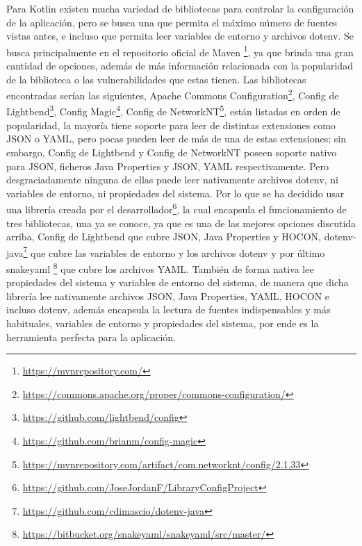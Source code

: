 Para Kotlin existen mucha variedad de bibliotecas para controlar la configuración de la aplicación, pero se busca 
una que permita el máximo número de fuentes vistas antes, e incluso que permita leer variables de entorno y archivos 
dotenv. Se busca principalmente en el repositorio oficial de Maven \footnote{\url{https://mvnrepository.com/}}, ya 
que brinda una gran cantidad de opciones, además de más información relacionada con la popularidad de la biblioteca 
o las vulnerabilidades que estas tienen. Las bibliotecas encontradas serían las siguientes, Apache Commons 
Configuration\footnote{\url{https://commons.apache.org/proper/commons-configuration/}}, Config de 
Lightbend\footnote{\url{https://github.com/lightbend/config}}, Config 
Magic\footnote{\url{https://github.com/brianm/config-magic}}, Config de 
NetworkNT\footnote{\url{https://mvnrepository.com/artifact/com.networknt/config/2.1.33}}, están listadas en orden de
popularidad, la mayoría tiene soporte para leer de distintas extensiones como JSON o YAML, pero pocas pueden leer de
más de una de estas extensiones; sin embargo, Config de Lightbend y  Config de NetworkNT poseen soporte nativo para 
JSON, ficheros Java Properties y JSON, YAML respectivamente. Pero desgraciadamente ninguna de ellas puede leer 
nativamente archivos dotenv, ni variables de entorno, ni propiedades del sistema. Por lo que se ha decidido usar una 
librería creada por el desarrollador\footnote{\url{https://github.com/JoseJordanF/LibraryConfigProject}}, la 
cual encapsula el funcionamiento de tres bibliotecas, una ya se conoce, ya que es una de las mejores opciones 
discutida arriba, Config de Lightbend que cubre JSON, Java Properties y HOCON, dotenv-
java\footnote{\url{https://github.com/cdimascio/dotenv-java}} que cubre las variables de entorno y los archivos 
dotenv y por último snakeyaml \footnote{\url{https://bitbucket.org/snakeyaml/snakeyaml/src/master/}} que cubre los 
archivos YAML. También de forma nativa lee propiedades del sistema y variables de entorno del sistema, de manera que 
dicha librería lee nativamente archivos JSON, Java Properties, YAML, HOCON e incluso dotenv, además encapsula la 
lectura de fuentes indispensables y más habituales, variables de entorno y propiedades del sistema, por ende es la herramienta 
perfecta para la aplicación.

